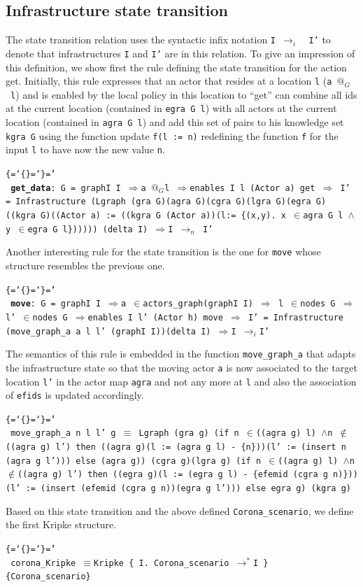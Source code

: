 \documentclass{llncs}
\makeatletter
\newenvironment{ttbox}{\begin{alltt}\ttbraces\small\tt}%
                      {\end{alltt}}
\def\ttbraces{\let\.=\nobreak\chardef\{=`\{\chardef\}=`\}\chardef\|=`\\}
\newcommand\ttand{\mbox{{$\land$}}}
\newcommand\ttequiv{\mbox{{$\equiv$}}}
\newcommand\ttin{\mbox{{$\in$}}}
\newcommand\ttnin{\mbox{{$\notin$}}}
\newcommand\ttImp{\mbox{{$\Longrightarrow$}}}
\newcommand\ttatI{\mbox{\( @_G \)}}
\newcommand\ttrelI{\mbox{{$\to_{i}$}}}
\newcommand\ttrelIstar{\mbox{{$\to^*$}}}
\newcommand\ttrel[1]{\mbox{{$\to_{#1}$}}}
\makeatother
\begin{document}
\subsection{Infrastructure state transition}
\label{sec:statetrans}
The state transition relation uses the syntactic infix notation 
\texttt{I \ttrelI\, I'}  to denote that infrastructures 
\texttt{I} and \texttt{I'} are in this relation.
To give an impression of this definition, we show first the rule defining the state transition for
the action get. Initially, this rule expresses that
an actor that resides at a location \texttt{l} (\texttt{a \ttatI\ l})
and is enabled by the local policy in this location to ``get'' can
combine  all ids at the current location (contained in \texttt{egra G l}) with
all actors at the current location (contained in \texttt{agra G l}) and add this
set of pairs to his knowledge set \texttt{kgra G} using the function update \texttt{f(l := n)}
redefining the function \texttt{f} for the input \texttt{l} to have now the new value \texttt{n}.
\begin{ttbox}
 {\bf{get\_data}}: G = graphI I \ttImp a \ttatI l \ttImp enables I l (Actor a) get \ttImp 
   I' = Infrastructure 
          (Lgraph (gra G)(agra G)(cgra G)(lgra G)(egra G)
            ((kgra G)((Actor a) := ((kgra G (Actor a))(l:=
                 \{(x,y). x \ttin agra G l \ttand y \ttin egra G l\})))))
          (delta I)
   \ttImp I \ttrel{n} I' 
\end{ttbox}
Another interesting rule for the state transition is the one for \texttt{move} whose structure
resembles the previous one.
\begin{ttbox}
 {\bf{move}}: G = graphI I \ttImp  a \ttin actors_graph(graphI I) \ttImp
    l \ttin nodes G \ttImp l' \ttin nodes G \ttImp enables I l' (Actor h) move \ttImp
    I' = Infrastructure (move_graph_a a l l' (graphI I))(delta I)
 \ttImp I \ttrelI I' 
\end{ttbox}
The semantics of this rule is embedded in the function \texttt{move\_graph\_a}
that adapts the infrastructure state so that the moving actor \texttt{a} is now
associated to the target location \texttt{l'} in the actor map \texttt{agra} and not
any more at \texttt{l} and also the association of \texttt{efids} is updated accordingly.
\begin{ttbox}
move_graph_a n l l' g \ttequiv
  Lgraph (gra g) 
         (if n \ttin ((agra g) l) \ttand  n \ttnin ((agra g) l') then 
           ((agra g)(l := (agra g l) - \{n\}))(l' := (insert n (agra g l')))
          else (agra g))
         (cgra g)(lgra g)
         (if n \ttin ((agra g) l) \ttand  n \ttnin ((agra g) l') then
               ((egra g)(l := (egra g l) - \{efemid (cgra g n)\}))
                        (l' := (insert (efemid (cgra g n))(egra g l')))
          else egra g)
         (kgra g)
\end{ttbox}  
Based on this state transition and the above defined \texttt{Corona\_scenario}, we define the first Kripke structure.
\begin{ttbox}
 corona_Kripke \ttequiv Kripke \{ I. Corona_scenario \ttrelIstar I \} \{Corona_scenario\}
\end{ttbox}
\end{document}
